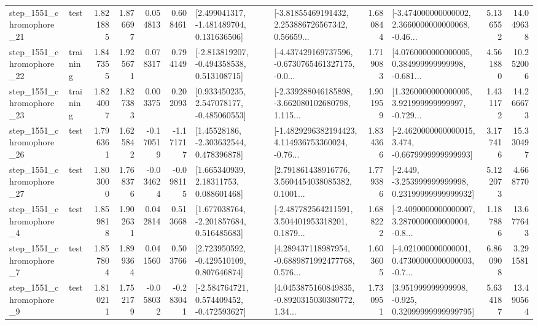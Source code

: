 \begin{tabular}{llrrrrllrlrr}
 step\_1551\_chromophore\_21 &      test &      1.821885 &    1.876697 &      0.054813 &  0.608461 &    [2.499041317, -1.481489704, 0.131636506] &  [-3.81855469191432, 2.253886726567342, 0.56659... &       1.680844 &  [-3.474000000000002, 2.3660000000000068, -0.46... &            5.136552 &         14.049638 \\
 step\_1551\_chromophore\_22 &  training &      1.847355 &    1.925671 &      0.078317 &  0.794149 &   [-2.813819207, -0.494358538, 0.513108715] &  [-4.437429169737596, -0.6730765461327175, -0.0... &       1.719083 &  [4.0760000000000005, 0.384999999999998, -0.681... &            4.561880 &         10.252006 \\
 step\_1551\_chromophore\_23 &  training &      1.824007 &    1.827383 &      0.003375 &  0.202093 &    [0.933450235, 2.547078177, -0.485060553] &  [-2.339288046185898, -3.662080102680798, 1.115... &       1.901959 &  [1.3260000000000005, 3.921999999999997, -0.729... &            1.431172 &         14.266673 \\
 step\_1551\_chromophore\_26 &      test &      1.796361 &    1.625842 &     -0.170519 & -1.171717 &     [1.45528186, -2.303632544, 0.478396878] &  [-1.4829296382194423, 4.114936753360024, -0.76... &       1.834366 &  [-2.4620000000000015, 3.474, -0.6679999999999993] &            3.177416 &         15.330497 \\
 step\_1551\_chromophore\_27 &      test &      1.803000 &    1.768376 &     -0.034624 & -0.098115 &      [1.665340939, 2.18311753, 0.088601468] &  [2.791861438916776, 3.5604454038085382, 0.1001... &       1.779386 &  [-2.449, -3.253999999999998, 0.23199999999999932] &            5.122073 &          4.668770 \\
  step\_1551\_chromophore\_4 &      test &      1.859818 &    1.902631 &      0.042814 &  0.513668 &    [1.677038764, -2.201857684, 0.516485683] &  [-2.487782564211591, 3.504401953318201, 0.1879... &       1.688222 &  [-2.4090000000000007, 3.2870000000000004, -0.8... &            1.187886 &         13.677643 \\
  step\_1551\_chromophore\_7 &      test &      1.857804 &    1.899364 &      0.041560 &  0.503766 &    [2.723950592, -0.429510109, 0.807646874] &  [4.289437118987954, -0.6889871992477768, 0.576... &       1.603605 &  [-4.021000000000001, 0.47300000000000003, -0.7... &            6.860908 &          3.291581 \\
  step\_1551\_chromophore\_9 &      test &      1.810211 &    1.752179 &     -0.058032 & -0.283041 &   [-2.584764721, 0.574409452, -0.472593627] &  [4.0453875160849835, -0.8920315030380772, 1.34... &       1.730951 &   [3.951999999999998, -0.925, 0.32099999999999795] &            5.634187 &         13.490564 \\

\end{tabular}
